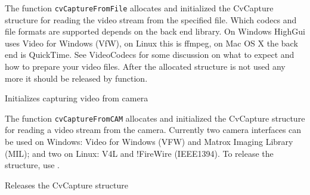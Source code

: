 
\begin{description}
\end{description}

The function \texttt{cvCaptureFromFile} allocates and initialized the CvCapture structure for reading the video stream from the specified file. Which codecs and file formats are supported depends on the back end library. On Windows HighGui uses Video for Windows (VfW), on Linux this is ffmpeg, on Mac OS X the back end is QuickTime. See VideoCodecs for some discussion on what to expect and how to prepare your video files.
\newline
\newline
After the allocated structure is not used any more it should be released by  function.


Initializes capturing video from camera


\begin{description}
\end{description}

The function \texttt{cvCaptureFromCAM} allocates and initialized the CvCapture structure for reading a video stream from the camera. Currently two camera interfaces can be used on Windows: Video for Windows (VFW) and Matrox Imaging Library (MIL); and two on Linux: V4L and !FireWire (IEEE1394).
\newline
\newline
To release the structure, use .


Releases the CvCapture structure


\begin{description}
\end{description}

